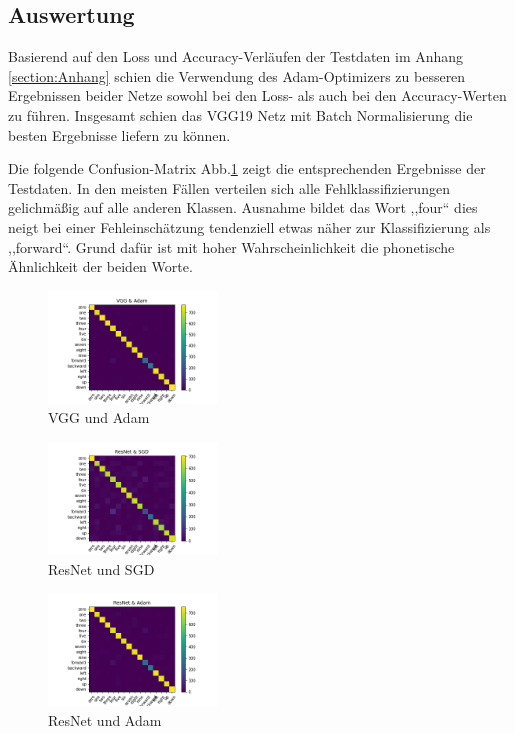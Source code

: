 \documentclass[sigconf]{acmart}
\begin{document}
\subsection{Auswertung}
Basierend auf den Loss und Accuracy-Verläufen der Testdaten im Anhang \ref{section:Anhang} schien die Verwendung des Adam-Optimizers zu besseren Ergebnissen beider Netze sowohl bei den Loss- als auch bei den Accuracy-Werten zu führen. Insgesamt schien das VGG19 Netz mit Batch Normalisierung die besten Ergebnisse liefern zu können.  

Die folgende Confusion-Matrix Abb.\ref{fig:Confusion-Matrix_VGG_Adam} zeigt die entsprechenden Ergebnisse der Testdaten. In den meisten Fällen verteilen sich alle Fehlklassifizierungen gelichmäßig auf alle anderen Klassen. Ausnahme bildet das Wort ,,four“ dies neigt bei einer Fehleinschätzung tendenziell etwas näher zur Klassifizierung als ,,forward“. Grund dafür ist mit hoher Wahrscheinlichkeit die phonetische Ähnlichkeit der beiden Worte.
\begin{figure}[H]
  \includegraphics[width=0.4\textwidth]{images/Confusion-Matrix_VGG_Adam}
  \caption{VGG und Adam}
  \Description{}
  \label{fig:Confusion-Matrix_VGG_Adam}
\end{figure} 

\begin{figure}[H]
  \includegraphics[width=0.4\textwidth]{images/Confusion-Matrix_ResNet_SGD}
  \caption{ResNet und SGD}
  \Description{}
  \label{fig:Confusion-Matrix_ResNet_SGD}
\end{figure} 

\begin{figure}[H]
  \includegraphics[width=0.4\textwidth]{images/Confusion-Matrix_ResNet_Adam}
  \caption{ResNet und Adam}
  \Description{}
  \label{fig:Confusion-Matrix_ResNet_Adam}
\end{figure} 
\end{document}
